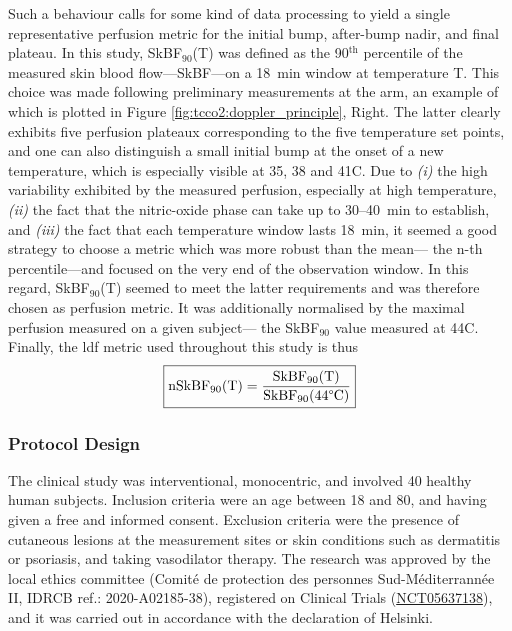 Such a behaviour calls for some kind of data processing to yield a single representative perfusion metric for the initial bump, after-bump nadir, and final plateau. In this study, SkBF$_{90}$(T) was defined as the 90$^\text{th}$ percentile of the measured skin blood flow---SkBF---on a 18~min window at temperature T. This choice was made following preliminary measurements at the arm, an example of which is plotted in Figure \ref{fig:tcco2:doppler_principle}, Right. The latter clearly exhibits five perfusion plateaux corresponding to the five temperature set points, and one can also distinguish a small initial bump at the onset of a new temperature, which is especially visible at 35, 38 and 41{\degree}C. Due to \textit{(i)} the high variability exhibited by the measured perfusion, especially at high temperature, \textit{(ii)} the fact that the nitric-oxide phase can take up to 30--40~min to establish\cite{barcroft1943, taylor1984, minson2001, frantz2012, delpozzi2016}, and \textit{(iii)} the fact that each temperature window lasts 18~min, it seemed a good strategy to choose a metric which was more robust than the mean---\eg{} the n-th percentile---and focused on the very end of the observation window. In this regard, SkBF$_{90}$(T) seemed to meet the latter requirements and was therefore chosen as perfusion metric. It was additionally normalised by the maximal perfusion measured on a given subject---\ie{} the SkBF$_{90}$ value measured at 44{\degree}C. Finally, the \gls{ldf} metric used throughout this study is thus
\begin{equation}
	\boxed{
		\mathrm{nSkBF_{90}(T)} = \frac{\mathrm{SkBF_{90}(T)}}{\mathrm{SkBF_{90}(44{\degree}C)}}
	}
\end{equation}

\subsubsection{Protocol Design}\label{subsect:tcco2:protocol}

The clinical study was interventional, monocentric, and involved 40 healthy human subjects. Inclusion criteria were an age between 18 and 80, and having given a free and informed consent. Exclusion criteria were the presence of cutaneous lesions at the measurement sites or skin conditions such as dermatitis or psoriasis, and taking vasodilator therapy. The research was approved by the local ethics committee (Comité de protection des personnes Sud-Méditerrannée II, IDRCB ref.: 2020-A02185-38), registered on Clinical Trials (\href{https://web.archive.org/web/20230224073221/https://clinicaltrials.gov/ct2/show/NCT05637138}{NCT05637138}), and it was carried out in accordance with the declaration of Helsinki.

